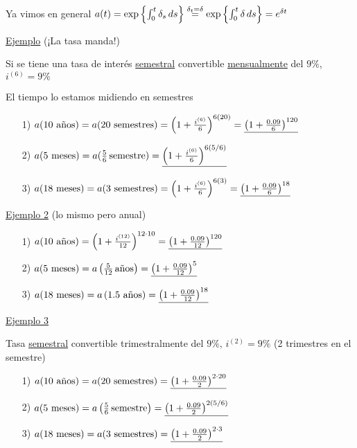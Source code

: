 \begin{enumerate}[label=\protect\circled{\arabic*}]
Ya vimos en general $a(t) = \exp\left\lbrace \integral{0}{t}{\delta_s}{s}\right\rbrace \mathrel{\stackon[1pt]{$=$}{$\scriptstyle\delta_t = \delta$}} \exp \left\lbrace \integral{0}{t}{\delta}{s} \right\rbrace = e^{\delta t}$

\uline{Ejemplo} (¡La tasa manda!)

Si se tiene una tasa de interés \uline{semestral} convertible \uline{mensualmente} del $9\%$, $i^{(6)}= 9\%$

El tiempo lo estamos midiendo en semestres
\begin{enumerate}
\item[1)] $a(\text{10 años}) = a(\text{20 semestres}) = \left(1 +\frac{i^{(6)}}{6} \right)^{6(20)} = \uline{\left(1+ \frac{0.09}{6} \right)^{120} }$
\item[2)] $a(\text{5 meses}) = a(\frac{5}{6} \, \text{semestre}) = \uline{\left(1+\frac{i^{(6)}}{6} \right)^{6(5/6)} }$
\item[3)]$a(\text{18 meses}) = a(\text{3 semestres}) = \left( 1+ \frac{i^{(6)}}{6}\right)^{6(3)} = \uline{\left(1 + \frac{0.09}{6} \right)^{18} } $
\end{enumerate}
\uline{Ejemplo 2} (lo mismo pero anual)
\begin{enumerate}
\item[1)] $a(\text{10 años}) = \left( 1+ \frac{i^{(12)}}{12}\right)^{12\cdot 10} = \uline{\left(1 + \frac{0.09}{12}\right)^{120} } $
\item[2)]$a(\text{5 meses}) = a\left(\frac{5}{12} \, \text{años} \right) = \uline{\left(1 + \frac{0.09}{12} \right)^5 }$
\item[3)]$a(\text{18 meses}) = a\left(\text{1.5 años} \right) = \uline{\left(1 + \frac{0.09}{12} \right)^{18} }$
\end{enumerate}
\uline{Ejemplo 3}

Tasa \uline{semestral} convertible trimestralmente del $9\%, \, i^{(2)} = 9\%$ (2 trimestres en el semestre)
\begin{enumerate}
\item[1)] $a(\text{10 años}) = a(\text{20 semestres}) = \uline{\left(1 + \frac{0.09}{2} \right)^{2\cdot 20} }$
\item[2)] $a(\text{5 meses}) = a\left(\frac{5}{6}\, \text{semestre} \right) = \uline{\left(1 + \frac{0.09}{2} \right)^{2(5/6)} }$
\item[3)] $a(\text{18 meses}) = a(\text{3 semestres}) = \uline{\left(1 + \frac{0.09}{2} \right)^{2\cdot 3} }$
\end{enumerate}
\end{enumerate}

